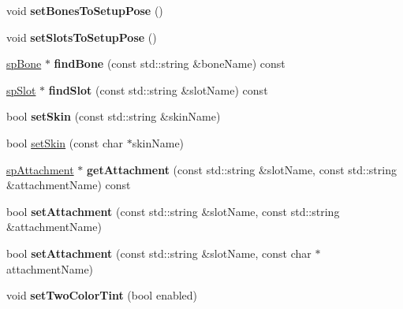 \begin{DoxyCompactItemize}
void {\bfseries set\+Bones\+To\+Setup\+Pose} ()
\item 
\mbox{\label{classspine_1_1SkeletonRenderer_a0594d3224172397abb49b2ea215488dd}} 
void {\bfseries set\+Slots\+To\+Setup\+Pose} ()
\item 
\mbox{\label{classspine_1_1SkeletonRenderer_a4d30f8ab7a36025e0fe8e5f1b73774f3}} 
\hyperlink{structspBone}{sp\+Bone} $\ast$ {\bfseries find\+Bone} (const std\+::string \&bone\+Name) const
\item 
\mbox{\label{classspine_1_1SkeletonRenderer_a0d2f5c71b2d092b8a5108dac5287ddd6}} 
\hyperlink{structspSlot}{sp\+Slot} $\ast$ {\bfseries find\+Slot} (const std\+::string \&slot\+Name) const
\item 
\mbox{\label{classspine_1_1SkeletonRenderer_a5c2238c995c1e33a25a476213d8b5cbb}} 
bool {\bfseries set\+Skin} (const std\+::string \&skin\+Name)
\item 
bool \hyperlink{classspine_1_1SkeletonRenderer_ab56abe60544227f4e4ce72c1ffd463c7}{set\+Skin} (const char $\ast$skin\+Name)
\item 
\mbox{\label{classspine_1_1SkeletonRenderer_a47ba81aa2a7720c14bb026c6bdc6e728}} 
\hyperlink{structspAttachment}{sp\+Attachment} $\ast$ {\bfseries get\+Attachment} (const std\+::string \&slot\+Name, const std\+::string \&attachment\+Name) const
\item 
\mbox{\label{classspine_1_1SkeletonRenderer_a538858bb3577e94b4118c0275783bc92}} 
bool {\bfseries set\+Attachment} (const std\+::string \&slot\+Name, const std\+::string \&attachment\+Name)
\item 
\mbox{\label{classspine_1_1SkeletonRenderer_a8b24604ed42ceed528e20c79b5a72bc6}} 
bool {\bfseries set\+Attachment} (const std\+::string \&slot\+Name, const char $\ast$attachment\+Name)
\item 
\mbox{\label{classspine_1_1SkeletonRenderer_a85986c6ab4b17036b895e4c8b3fab750}} 
void {\bfseries set\+Two\+Color\+Tint} (bool enabled)

\end{DoxyCompactItemize}
